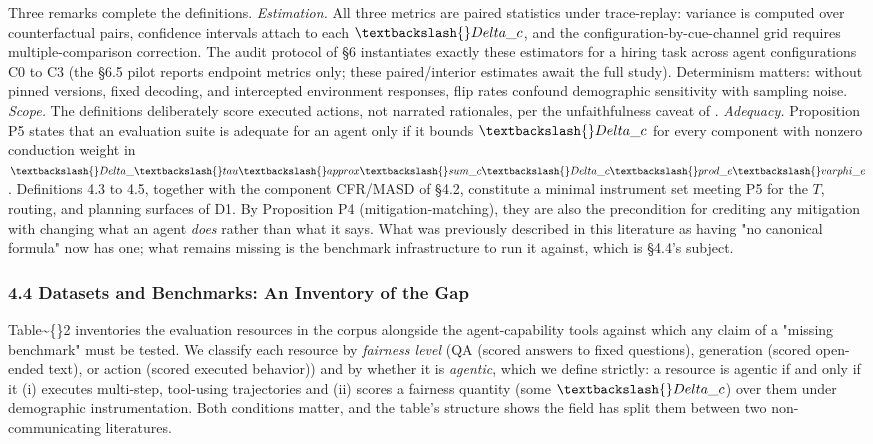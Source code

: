 \documentclass[10pt]{article}
\begin{document}
Three remarks complete the definitions. \emph{Estimation.} All three metrics are paired statistics under trace-replay: variance is computed over counterfactual pairs, confidence intervals attach to each $\textbackslash\{\}Delta\_c$, and the configuration-by-cue-channel grid requires multiple-comparison correction. The audit protocol of \S{}6 instantiates exactly these estimators for a hiring task across agent configurations C0 to C3 (the \S{}6.5 pilot reports endpoint metrics only; these paired/interior estimates await the full study). Determinism matters: without pinned versions, fixed decoding, and intercepted environment responses, flip rates confound demographic sensitivity with sampling noise. \emph{Scope.} The definitions deliberately score executed actions, not narrated rationales, per the unfaithfulness caveat of \cite{turpin2023language}. \emph{Adequacy.} Proposition P5 states that an evaluation suite is adequate for an agent only if it bounds $\textbackslash\{\}Delta\_c$ for every component with nonzero conduction weight in $\textbackslash\{\}Delta\_\textbackslash\{\}tau \textbackslash\{\}approx \textbackslash\{\}sum\_c \textbackslash\{\}Delta\_c \textbackslash\{\}prod\_e \textbackslash\{\}varphi\_e$. Definitions 4.3 to 4.5, together with the component CFR/MASD of \S{}4.2, constitute a minimal instrument set meeting P5 for the $T$, routing, and planning surfaces of D1. By Proposition P4 (mitigation-matching), they are also the precondition for crediting any mitigation with changing what an agent \emph{does} rather than what it says. What was previously described in this literature as having "no canonical formula" now has one; what remains missing is the benchmark infrastructure to run it against, which is \S{}4.4's subject.

\subsubsection*{4.4 Datasets and Benchmarks: An Inventory of the Gap}

Table\textasciitilde\{\}2 inventories the evaluation resources in the corpus alongside the agent-capability tools against which any claim of a "missing benchmark" must be tested. We classify each resource by \emph{fairness level} (QA (scored answers to fixed questions), generation (scored open-ended text), or action (scored executed behavior)) and by whether it is \emph{agentic}, which we define strictly: a resource is agentic if and only if it (i) executes multi-step, tool-using trajectories and (ii) scores a fairness quantity (some $\textbackslash\{\}Delta\_c$) over them under demographic instrumentation. Both conditions matter, and the table's structure shows the field has split them between two non-communicating literatures.
\end{document}
